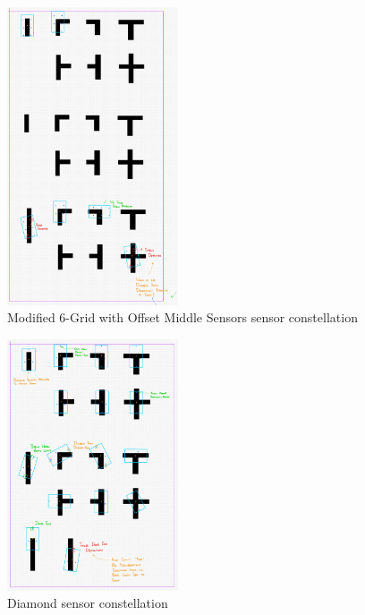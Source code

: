 \documentclass[conference]{IEEEtran}
\begin{document}
\begin{figure}[htbp]
	\centerline{\includegraphics[width=0.45\textwidth]{constellation-6-offset.png}}
	\caption{Modified 6-Grid with Offset Middle Sensors sensor constellation}
	\label{fig:constellation-6-offset}
\end{figure}
\begin{figure}[htbp]
	\centerline{\includegraphics[width=0.45\textwidth]{constellation-diamond.png}}
	\caption{Diamond sensor constellation}
	\label{fig:constellation-diamond}
\end{figure}
\end{document}
